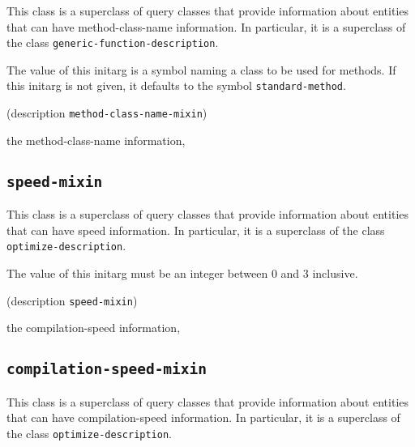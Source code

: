 {\footnotesize
{}
}

This class is a superclass of query classes that provide information
about entities that can have method-class-name information.  In
particular, it is a superclass of the class
\texttt{generic-function-description}.

{\footnotesize
{}
}

The value of this initarg is a symbol naming a class to be used for
methods.  If this initarg is not given, it defaults to the symbol
\texttt{standard-method}.

{\footnotesize
{} {(description {\tt method-class-name-mixin})}
}

 the method-class-name information, 

\subsection{\texttt{speed-mixin}}
\label{sec-speed-mixin}

{\footnotesize
{}
}

This class is a superclass of query classes that provide information
about entities that can have speed information.  In particular, it is a
superclass of the class \texttt{optimize-description}.

{\footnotesize
{}
}

The value of this initarg must be an integer between $0$ and $3$
inclusive.

{\footnotesize
{} {(description {\tt speed-mixin})}
}

 the compilation-speed information, 

\subsection{\texttt{compilation-speed-mixin}}
\label{sec-compilation-speed-mixin}

{\footnotesize
{}
}

This class is a superclass of query classes that provide information
about entities that can have compilation-speed information.  In particular, it is a
superclass of the class \texttt{optimize-description}.

{\footnotesize
{}
}

